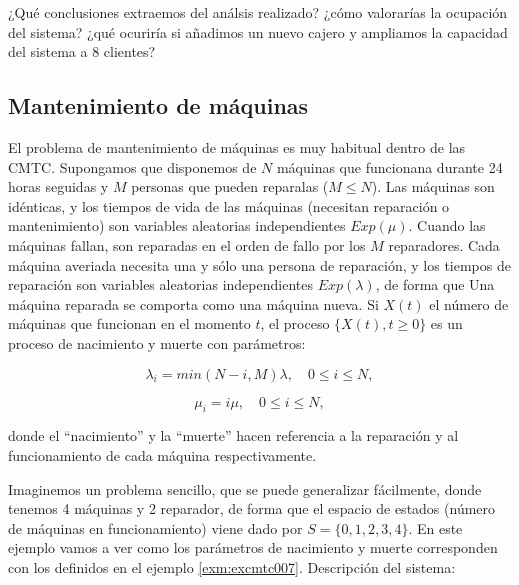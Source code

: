 \documentclass[
]{book}
\theoremstyle{definition}
\theoremstyle{definition}
\theoremstyle{definition}
\theoremstyle{definition}
\theoremstyle{remark}
\begin{document}
¿Qué conclusiones extraemos del análsis realizado? ¿cómo valorarías la ocupación del sistema? ¿qué ocuriría si añadimos un nuevo cajero y ampliamos la capacidad del sistema a 8 clientes?

\hypertarget{mantenimiento-de-muxe1quinas}{%
\subsection{Mantenimiento de máquinas}\label{mantenimiento-de-muxe1quinas}}

El problema de mantenimiento de máquinas es muy habitual dentro de las CMTC. Supongamos que disponemos de \(N\) máquinas que funcionana durante 24 horas seguidas y \(M\) personas que pueden reparalas (\(M \leq N\)). Las máquinas son idénticas, y los tiempos de vida de las máquinas (necesitan reparación o mantenimiento) son variables aleatorias independientes \(Exp(\mu)\). Cuando las máquinas fallan, son reparadas en el orden de fallo por los \(M\) reparadores. Cada máquina averiada necesita una y sólo una persona de reparación, y los tiempos de reparación son variables aleatorias independientes \(Exp(\lambda)\), de forma que Una máquina reparada se comporta como una máquina nueva. Si \(X(t)\) el número de máquinas que funcionan en el momento \(t\), el proceso \(\{X(t), t \geq 0\}\) es un proceso de nacimiento y muerte con parámetros:

\[\lambda_i = min(N-i, M)\lambda, \quad 0 \leq i \leq N,\]

\[\mu_i = i\mu, \quad 0 \leq i \leq N,\]

donde el ``nacimiento'' y la ``muerte'' hacen referencia a la reparación y al funcionamiento de cada máquina respectivamente.

Imaginemos un problema sencillo, que se puede generalizar fácilmente, donde tenemos 4 máquinas y 2 reparador, de forma que el espacio de estados (número de máquinas en funcionamiento) viene dado por \(S = \{0, 1, 2, 3, 4\}\). En este ejemplo vamos a ver como los parámetros de nacimiento y muerte corresponden con los definidos en el ejemplo \ref{exm:excmtc007}. Descripción del sistema:
\end{document}
